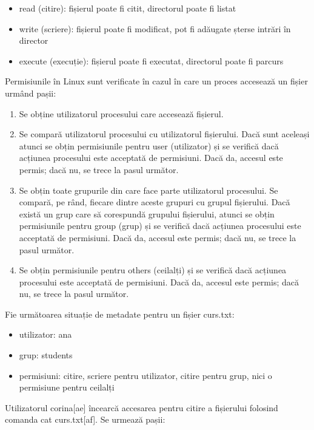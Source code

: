 \begin{itemize}
	\item read (citire): fișierul poate fi citit, directorul poate fi listat
	\item write (scriere): fișierul poate fi modificat, pot fi adăugate
		șterse intrări în director
	\item execute (execuție): fișierul poate fi executat, directorul poate
		fi parcurs
\end{itemize}

Permisiunile în Linux sunt verificate în cazul în care un proces accesează un fișier urmând pașii:

\begin{enumerate}
	\item Se obține utilizatorul procesului care accesează fișierul.
	\item Se compară utilizatorul procesului cu utilizatorul fișierului.
		Dacă sunt aceleași atunci se obțin permisiunile pentru user
		(utilizator) și se verifică dacă acțiunea procesului este
		acceptată de permisiuni. Dacă da, accesul este permis; dacă nu,
		se trece la pasul următor.
	\item Se obțin toate grupurile din care face parte utilizatorul
		procesului. Se compară, pe rând, fiecare dintre aceste grupuri
		cu grupul fișierului. Dacă există un grup care să corespundă
		grupului fișierului, atunci se obțin permisiunile pentru group
		(grup) și se verifică dacă acțiunea procesului este acceptată de
		permisiuni. Dacă da, accesul este permis; dacă nu, se trece la
		pasul următor.
	\item Se obțin permisiunile pentru others (ceilalți) și se verifică dacă
		acțiunea procesului este acceptată de permisiuni. Dacă da,
		accesul este permis; dacă nu, se trece la pasul următor.
\end{enumerate}

Fie următoarea situație de metadate pentru un fișier curs.txt:

\begin{itemize}
	\item utilizator: ana
	\item grup: students
	\item permisiuni: citire, scriere pentru utilizator, citire pentru grup,
		nici o permisiune pentru ceilalți
\end{itemize}

Utilizatorul corina[ae] încearcă accesarea pentru citire a fișierului folosind
comanda cat curs.txt[af]. Se urmează pașii:

